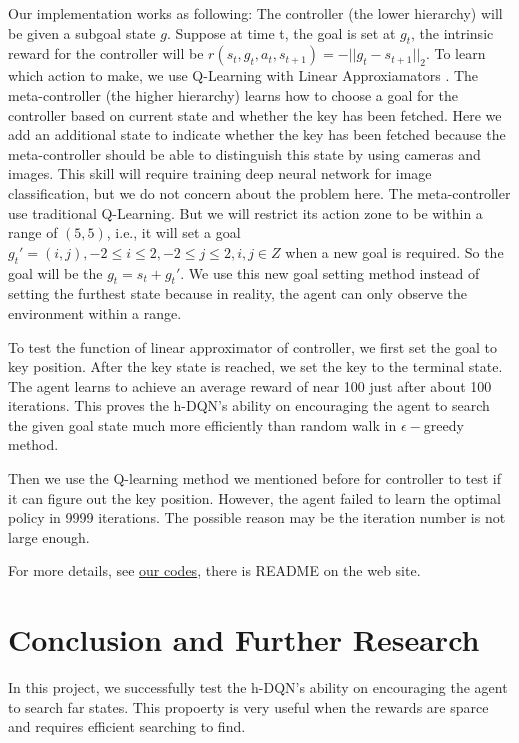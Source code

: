 \documentclass{article}
\begin{document}
\begin{spacing}{1.1}
    Our implementation works as following: The controller (the lower hierarchy) will be given a subgoal state $g$. Suppose at time t, the goal is set at $g_t$, the intrinsic reward for the controller will be $r(s_t, g_t, a_t, s_{t+1}) = -||g_t - s_{t+1}||_2$. To learn which action to make, we use Q-Learning with Linear Approxiamators \cite{lecture}. The meta-controller (the higher hierarchy) learns how to choose a goal for the controller based on current state and whether the key has been fetched. Here we add an additional state to indicate whether the key has been fetched because the meta-controller should be able to distinguish this state by using cameras and images. This skill will require training deep neural network for image classification, but we do not concern about the problem here. The meta-controller use traditional Q-Learning. But we will restrict its action zone to be within a range of $(5, 5)$, i.e., it will set a goal $g_t' = (i, j), -2\leq i\leq 2, -2\leq j\leq 2, i, j\in Z$ when a new goal is required. So the goal will be the $g_t = s_t + g_t'$. We use this new goal setting method instead of setting the furthest state because in reality, the agent can only observe the environment within a range.

    To test the function of linear approximator of controller, we first set the goal to key position. After the key state is reached, we set the key to the terminal state. The agent learns to achieve an average reward of near 100 just after about 100 iterations. This proves the h-DQN's ability on encouraging the agent to search the given goal state much more efficiently than random walk in $\epsilon-$greedy method.
    
    Then we use the Q-learning method we mentioned before for controller to test if it can figure out the key position. However, the agent failed to learn the optimal policy in 9999 iterations. The possible reason may be the iteration number is not large enough.

    For more details, see \href{https://github.com/faebdc/AI-Project}{our codes}, there is README on the web site.

    \section{Conclusion and Further Research}
    In this project, we successfully test the h-DQN's ability on encouraging the agent to search far states. This propoerty is very useful when the rewards are sparce and requires efficient searching to find.
    

\end{spacing}
\end{document}
